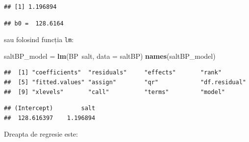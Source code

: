 \documentclass[]{article}
\newenvironment{Shaded}{\begin{snugshade}}{\end{snugshade}}
\newcommand{\KeywordTok}[1]{\textcolor[rgb]{0.13,0.29,0.53}{\textbf{{#1}}}}
\newcommand{\DataTypeTok}[1]{\textcolor[rgb]{0.13,0.29,0.53}{{#1}}}
\newcommand{\StringTok}[1]{\textcolor[rgb]{0.31,0.60,0.02}{{#1}}}
\newcommand{\CommentTok}[1]{\textcolor[rgb]{0.56,0.35,0.01}{\textit{{#1}}}}
\newcommand{\NormalTok}[1]{{#1}}
\begin{document}
\begin{verbatim}
## [1] 1.196894
\end{verbatim}

\begin{Shaded}
\end{Shaded}

\begin{verbatim}
## b0 =  128.6164
\end{verbatim}

sau folosind funcția \texttt{lm}:

\begin{Shaded}
\begin{Highlighting}[]
\NormalTok{saltBP_model =}\StringTok{ }\KeywordTok{lm}\NormalTok{(BP~salt, }\DataTypeTok{data =} \NormalTok{saltBP)}
\KeywordTok{names}\NormalTok{(saltBP_model)}
\end{Highlighting}
\end{Shaded}

\begin{verbatim}
##  [1] "coefficients"  "residuals"     "effects"       "rank"         
##  [5] "fitted.values" "assign"        "qr"            "df.residual"  
##  [9] "xlevels"       "call"          "terms"         "model"
\end{verbatim}

\begin{Shaded}
\end{Shaded}

\begin{verbatim}
## (Intercept)        salt 
##  128.616397    1.196894
\end{verbatim}

Dreapta de regresie este:
\end{document}
